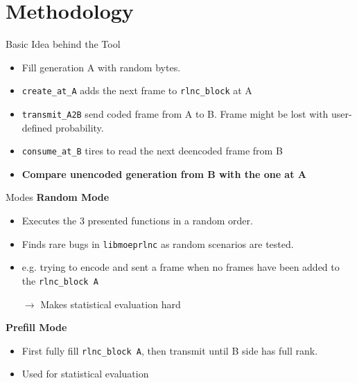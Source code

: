 \documentclass[t]{beamer} %
\begin{document}
\section{Methodology}
\begin{frame}{Basic Idea behind the Tool}
	\begin{figure}[htb]
	\end{figure}
	\pause
	\begin{itemize}
		\begin{itemize}
			\item Fill generation A with random bytes.
			      \pause
			\item \texttt{create\_at\_A} adds the next frame to \texttt{rlnc\_block} at A
			      \pause
			\item \texttt{transmit\_A2B} send coded frame from A to B. Frame might be lost with user-defined probability.
			      \pause
			\item \texttt{consume\_at\_B} tires to read the next deencoded frame from B
			      \pause
			\item \textbf{Compare unencoded generation from B with the one at A}
		\end{itemize}
	\end{itemize}
\end{frame}

\begin{frame}{Modes}
	\textbf{Random Mode}
	\begin{itemize}
		\item Executes the 3 presented functions in a random order.
		\item Finds rare bugs in \texttt{libmoeprlnc} as random scenarios are tested.
		\item e.g. trying to encode and sent a frame when no frames have been added to the \texttt{rlnc\_block A}
		      \pause
		\item[$\rightarrow$] Makes statistical evaluation hard
	\end{itemize}
	\pause
	\textbf{Prefill Mode}
	\begin{itemize}
		\item First fully fill \texttt{rlnc\_block A}, then transmit until B side has full rank.
		\item Used for statistical evaluation
	\end{itemize}
\end{frame}
\end{document}
